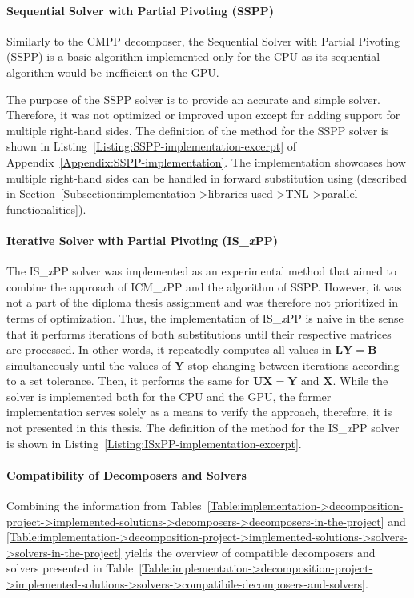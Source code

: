 \paragraph{Sequential Solver with Partial Pivoting (SSPP)}\label{Paragraph:implementation->decomposition-project->implemented-solutions->solvers->SSPP}
Similarly to the CMPP decomposer, the Sequential Solver with Partial Pivoting (SSPP) is a basic algorithm implemented only for the CPU as its sequential algorithm would be inefficient on the GPU.

The purpose of the SSPP solver is to provide an accurate and simple solver.
Therefore, it was not optimized or improved upon except for adding support for multiple right-hand sides.
The definition of the  method for the SSPP solver is shown in Listing~\ref{Listing:SSPP-implementation-excerpt} of Appendix~\ref{Appendix:SSPP-implementation}.
The implementation showcases how multiple right-hand sides can be handled in forward substitution using  (described in Section~\ref{Subsection:implementation->libraries-used->TNL->parallel-functionalities}).

\paragraph{Iterative Solver with Partial Pivoting (IS\_\textit{x}PP)}\label{Paragraph:implementation->decomposition-project->implemented-solutions->solvers->ISxPP}
The IS\_\textit{x}PP solver was implemented as an experimental method that aimed to combine the approach of ICM\_\textit{x}PP and the algorithm of SSPP.
However, it was not a part of the diploma thesis assignment and was therefore not prioritized in terms of optimization.
Thus, the implementation of IS\_\textit{x}PP is naive in the sense that it performs iterations of both substitutions until their respective matrices are processed.
In other words, it repeatedly computes all values in $\mathbf{LY} = \mathbf{B}$ simultaneously until the values of $\mathbf{Y}$ stop changing between iterations according to a set tolerance.
Then, it performs the same for $\mathbf{UX} = \mathbf{Y}$ and $\mathbf{X}$.
While the solver is implemented both for the CPU and the GPU, the former implementation serves solely as a means to verify the approach, therefore, it is not presented in this thesis.
The definition of the  method for the IS\_\textit{x}PP solver is shown in Listing~\ref{Listing:ISxPP-implementation-excerpt}.

\paragraph{Compatibility of Decomposers and Solvers} Combining the information from Tables~\ref{Table:implementation->decomposition-project->implemented-solutions->decomposers->decomposers-in-the-project} and \ref{Table:implementation->decomposition-project->implemented-solutions->solvers->solvers-in-the-project} yields the overview of compatible decomposers and solvers presented in Table~\ref{Table:implementation->decomposition-project->implemented-solutions->solvers->compatibile-decomposers-and-solvers}.

